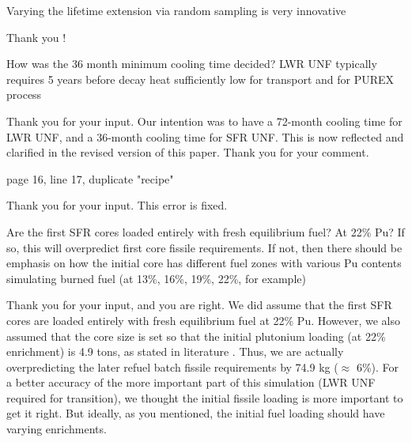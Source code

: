 \documentclass[answers,11pt]{exam}
\begin{document}
\begin{questions}
        \question Varying the lifetime extension via random sampling is very 
        innovative
        \begin{solution}
                Thank you !
        \end{solution}

        \question How was the 36 month minimum cooling time decided? LWR UNF 
        typically requires 5 years before decay heat sufficiently low for 
        transport and for PUREX process

        \begin{solution}
                Thank you for your input. Our intention was to have a 72-month
                cooling time for LWR UNF, and a 36-month cooling time for SFR UNF.
                This is now reflected and clarified in the revised version of
                this paper. Thank you for your comment.
        \end{solution}

        \question page 16, line 17, duplicate "recipe"
        \begin{solution}
                Thank you for your input. This error is fixed.
        \end{solution}

        \question Are the first SFR cores loaded entirely with fresh 
        equilibrium fuel? At 22\% Pu?  If so, this will overpredict first core 
        fissile requirements. If not, then there should be emphasis on how the 
        initial core has different fuel zones with various Pu contents 
        simulating burned fuel (at 13\%, 16\%, 19\%, 22\%, for example)

        \begin{solution}
                Thank you for your input, and you are right. We did assume
                that the first SFR cores are loaded entirely with
                fresh equilibrium fuel at 22\% Pu. However, we also assumed
                that the core size is set so that the initial plutonium
                loading (at 22\% enrichment) is 4.9 tons, as stated in
                literature \cite{chenaud_status_2013}. Thus, we are
                actually overpredicting the later refuel batch fissile
                requirements by 74.9 kg ($\approx$ 6\%). For a better
                accuracy of the more important part of this simulation
                (LWR UNF required for transition), we thought the 
                initial fissile loading is more important to get it right.
                But ideally, as you mentioned, the initial fuel loading
                should have varying enrichments.       
        \end{solution}



\end{questions}
\end{document}
